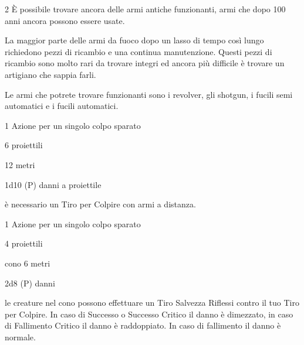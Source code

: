 \begin{multicols}{2}
È possibile trovare ancora delle armi antiche funzionanti, armi che dopo 100 anni ancora possono essere usate.

La maggior parte delle armi da fuoco dopo un lasso di tempo così lungo richiedono pezzi di ricambio e una continua manutenzione. Questi pezzi di ricambio sono molto rari da trovare integri ed ancora più difficile è trovare un artigiano che sappia farli.

Le armi che potrete trovare funzionanti sono i revolver, gli shotgun, i fucili semi automatici e i fucili automatici.

\medskip

\begin{description}[noitemsep, topsep=0pt, parsep=0pt, partopsep=0pt, leftmargin=0cm, labelwidth=2cm]
\item[\textbf{Revolver}]
\item[\textbf{Azioni:}] 1 Azione per un singolo colpo sparato
\item[\textbf{Caricatore:}] 6 proiettili
\item[\textbf{Gittata:}] 12 metri
\item[\textbf{Danno:}] 1d10 (P) danni a proiettile
\item[\textbf{Regole:}] è necessario un Tiro per Colpire con armi a distanza.
\end{description}

\medskip

\begin{description}[noitemsep, topsep=0pt, parsep=0pt, partopsep=0pt, leftmargin=0cm, labelwidth=2cm]
	\item[\textbf{Shotgun}]
	\item[\textbf{Azioni:}] 1 Azione per un singolo colpo sparato
	\item[\textbf{Caricatore:}] 4 proiettili
	\item[\textbf{Gittata:}] cono 6 metri
	\item[\textbf{Danno:}] 2d8 (P) danni
	\item[\textbf{Regole:}] le creature nel cono possono effettuare un Tiro Salvezza Riflessi contro il tuo Tiro per Colpire. In caso di Successo o Successo Critico il danno è dimezzato, in caso di Fallimento Critico il danno è raddoppiato. In caso di fallimento il danno è normale.
\end{description}

\medskip


\end{multicols}

